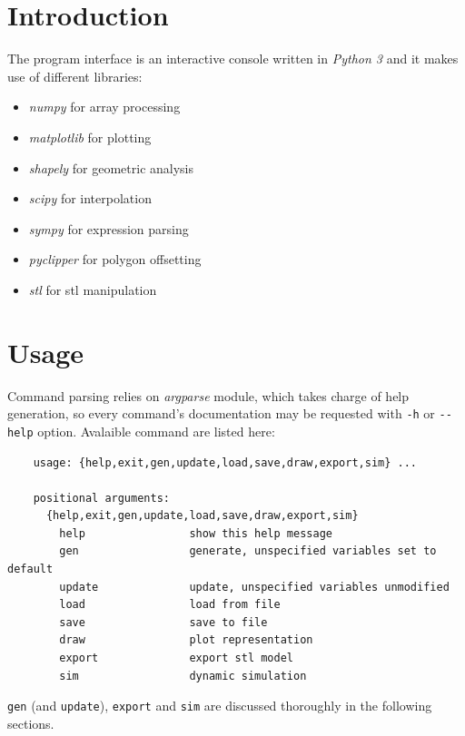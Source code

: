 \documentclass[a4paper,10pt,twoside]{article}
\begin{document}
\section{Introduction}
    The program interface is an interactive console written in \emph{Python 3} and it makes use of different libraries:

    \begin{itemize}\itemsep0em
        \item
          \emph{numpy} for array processing
        \item
          \emph{matplotlib} for plotting
        \item
          \emph{shapely} for geometric analysis
        \item
          \emph{scipy} for interpolation
        \item
          \emph{sympy} for expression parsing
        \item
          \emph{pyclipper} for polygon offsetting
        \item
          \emph{stl} for stl manipulation
    \end{itemize}

\section{Usage}
    Command parsing relies on \emph{argparse} module, which takes charge of
    help generation, so every command's documentation may be requested with
    \texttt{-h} or \texttt{-\/-help} option. Avalaible command are listed here:

    \begin{verbatim}
    usage: {help,exit,gen,update,load,save,draw,export,sim} ...

    positional arguments:
      {help,exit,gen,update,load,save,draw,export,sim}
        help                show this help message
        gen                 generate, unspecified variables set to default
        update              update, unspecified variables unmodified
        load                load from file
        save                save to file
        draw                plot representation
        export              export stl model
        sim                 dynamic simulation
    \end{verbatim}

    \texttt{gen} (and \texttt{update}), \texttt{export} and \texttt{sim} are
    discussed thoroughly in the following sections.
\end{document}
